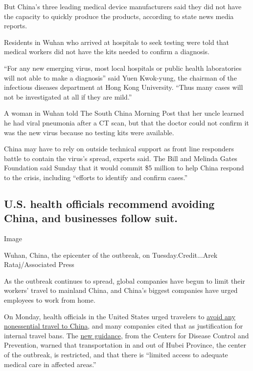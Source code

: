 But China's three leading medical device manufacturers said they did not
have the capacity to quickly produce the products, according to state
news media reports.

Residents in Wuhan who arrived at hospitals to seek testing were told
that medical workers did not have the kits needed to confirm a
diagnosis.

``For any new emerging virus, most local hospitals or public health
laboratories will not able to make a diagnosis'' said Yuen Kwok-yung,
the chairman of the infectious diseases department at Hong Kong
University. ``Thus many cases will not be investigated at all if they
are mild.''

A woman in Wuhan told The South China Morning Post that her uncle
learned he had viral pneumonia after a CT scan, but that the doctor
could not confirm it was the new virus because no testing kits were
available.

China may have to rely on outside technical support as front line
responders battle to contain the virus's spread, experts said. The Bill
and Melinda Gates Foundation said Sunday that it would commit \$5
million to help China respond to the crisis, including ``efforts to
identify and confirm cases.''

\hypertarget{us-health-officials-recommend-avoiding-china-and-businesses-follow-suit}{%
\subsection{U.S. health officials recommend avoiding China, and
businesses follow
suit.}\label{us-health-officials-recommend-avoiding-china-and-businesses-follow-suit}}

Image

Wuhan, China, the epicenter of the outbreak, on Tuesday.Credit...Arek
Rataj/Associated Press

As the outbreak continues to spread, global companies have begun to
limit their workers' travel to mainland China, and China's biggest
companies have urged employees to work from home.

On Monday, health officials in the United States urged travelers to
\href{https://wwwnc.cdc.gov/travel/notices/warning/novel-coronavirus-china}{avoid
any nonessential travel to China}, and many companies cited that as
justification for internal travel bans. The
\href{https://wwwnc.cdc.gov/travel/notices/warning/novel-coronavirus-china}{new
guidance}, from the Centers for Disease Control and Prevention, warned
that transportation in and out of Hubei Province, the center of the
outbreak, is restricted, and that there is ``limited access to adequate
medical care in affected areas.''


